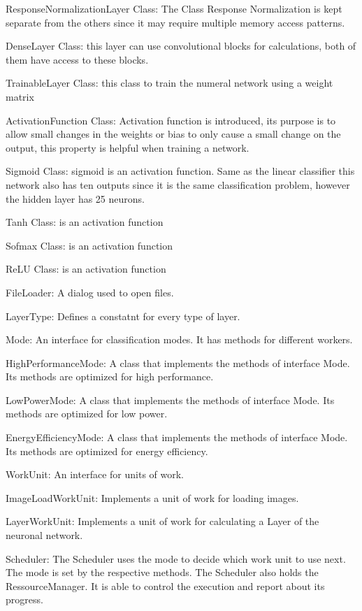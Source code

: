 \documentclass[parskip=full]{scrartcl}
\begin{document}
ResponseNormalizationLayer Class: The Class Response Normalization is kept separate from the others since it may require multiple memory access patterns.

DenseLayer Class:  this layer can use convolutional blocks for calculations, both of them have access to these blocks.

TrainableLayer Class: this class to train the numeral network using a weight matrix

ActivationFunction Class:  Activation function is introduced, its purpose is to allow small changes in the weights or bias to only cause a small change on the output, this property is helpful when training a network.

Sigmoid Class: sigmoid is an activation function.  Same as the linear classifier this network also has ten outputs since it is the same classification problem, however the hidden layer has 25 neurons.

Tanh Class: is an activation function

Sofmax Class: is an activation function

ReLU Class:  is an activation function





FileLoader: A dialog used to open files.

LayerType: Defines a constatnt for every type of layer.

Mode: An interface for classification modes. It has methods for different workers.

HighPerformanceMode: A class that implements the methods of interface Mode. Its methods are optimized for high performance.

LowPowerMode: A class that implements the methods of interface Mode. Its methods are optimized for low power.

EnergyEfficiencyMode: A class that implements the methods of interface Mode. Its methods are optimized for energy efficiency.

WorkUnit: An interface for units of work.

ImageLoadWorkUnit: Implements a unit of work for loading images.

LayerWorkUnit: Implements a unit of work for calculating a Layer of the neuronal network.

Scheduler: The Scheduler uses the mode to decide which work unit to use next. The mode is set by the respective methods. The Scheduler also holds the RessourceManager. It is able to control the execution and report about its progress.
\end{document}
